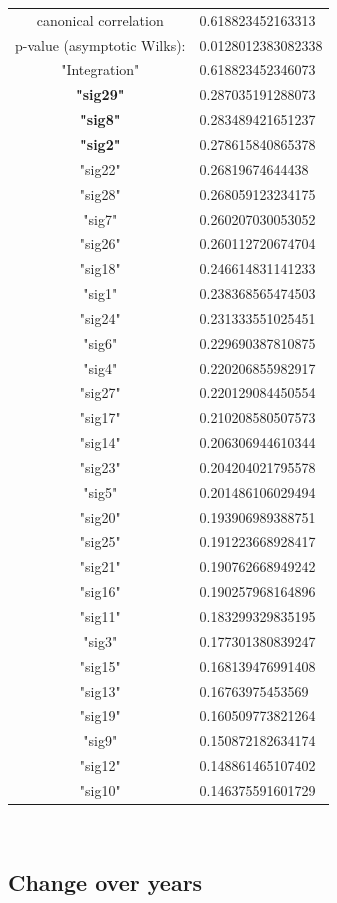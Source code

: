 \documentclass[11pt,a4paper,oneside]{report}
\begin{document}
\begin{tabular}{ c | l }
canonical correlation &  0.618823452163313\\
p-value (asymptotic Wilks): & 0.0128012383082338\\
\hline
"Integration" & 0.618823452346073\\
\hline
\textbf{"sig29"} & 0.287035191288073\\
\textbf{"sig8"} & 0.283489421651237\\
\textbf{"sig2"} & 0.278615840865378\\
"sig22" & 0.26819674644438\\
"sig28" & 0.268059123234175\\
"sig7" & 0.260207030053052\\
"sig26" & 0.260112720674704\\
"sig18" & 0.246614831141233\\
"sig1" & 0.238368565474503\\
"sig24" & 0.231333551025451\\
"sig6" & 0.229690387810875\\
"sig4" & 0.220206855982917\\
"sig27" & 0.220129084450554\\
"sig17" & 0.210208580507573\\
"sig14" & 0.206306944610344\\
"sig23" & 0.204204021795578\\
"sig5" & 0.201486106029494\\
"sig20" & 0.193906989388751\\
"sig25" & 0.191223668928417\\
"sig21" & 0.190762668949242\\
"sig16" & 0.190257968164896\\
"sig11" & 0.183299329835195\\
"sig3"& 0.177301380839247\\
"sig15"& 0.168139476991408\\
"sig13"& 0.16763975453569\\
"sig19"& 0.160509773821264\\
"sig9" &0.150872182634174\\
"sig12"& 0.148861465107402\\
"sig10"& 0.146375591601729\\
\end{tabular}\\

\subsection*{Change over years}
\end{document}
